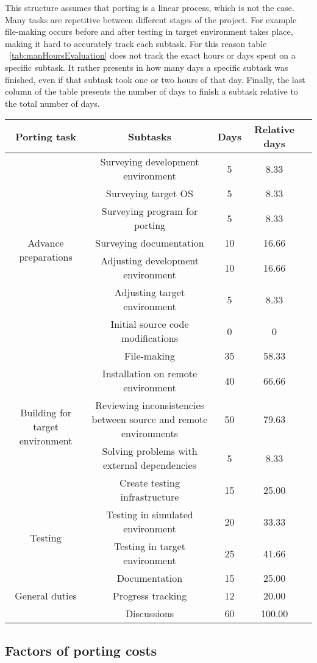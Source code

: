 This structure assumes that porting is a linear process, which is not the case.
Many tasks are repetitive between different stages of the project. For example
file-making occurs before and after testing in target environment takes place,
making it hard to accurately track each subtask. For this reason table
~\ref{tab:manHoursEvaluation} does not track the exact hours or days spent
on a specific subtask. It rather presents in how many days a specific subtask
was finished, even if that subtask took one or two hours of that day. Finally,
the last column of the table presents the number of days to finish a subtask
relative to the total number of days.

\begin{table*}
\centering
\begin{tabular}{ |c|c|c|c|c| }
\hline
Porting task & Subtasks & Days & Relative days \\
\hline
\multirow{7}{5em}{Advance preparations} & Surveying development environment & 5 & 8.33\\
& Surveying target OS & 5 & 8.33 \\
& Surveying program for porting & 5 & 8.33 \\
& Surveying documentation & 10 & 16.66 \\
& Adjusting development environment & 10 & 16.66 \\
& Adjusting target environment & 5 & 8.33 \\
& Initial source code modifications & 0 & 0 \\
\hline
\multirow{5}{5em}{Building for target environment} & File-making & 35  & 58.33\\
& Installation on remote environment & 40 & 66.66 \\
& Reviewing inconsistencies between source and remote environments & 50 & 79.63 \\
& Solving problems with external dependencies & 5 & 8.33 \\
& Create testing infrastructure & 15 & 25.00 \\
\hline
\multirow{2}{5em}{Testing} & Testing in simulated environment & 20  & 33.33\\
& Testing in target environment & 25 & 41.66 \\
\hline
\multirow{3}{5em}{General duties} & Documentation & 15  & 25.00 \\
& Progress tracking & 12 & 20.00 \\
& Discussions & 60 & 100.00 \\
\hline
\end{tabular}
\caption{Man-days evaluation for porting tasks}
\label{tab:manHoursEvaluation}
\end{table*}

\subsection{Factors of porting costs}
